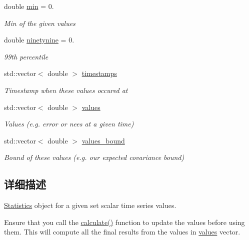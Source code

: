 \begin{DoxyCompactItemize}
\mbox{\label{structov__eval_1_1Statistics_ada14c28c46581e4e928f8eb7c86fdd06}} 
double \hyperlink{structov__eval_1_1Statistics_ada14c28c46581e4e928f8eb7c86fdd06}{min} = 0.
\begin{DoxyCompactList}\small\item\em Min of the given values \end{DoxyCompactList}\item 
\mbox{\label{structov__eval_1_1Statistics_a61e02141acabdb35b6e9bc9c1722653f}} 
double \hyperlink{structov__eval_1_1Statistics_a61e02141acabdb35b6e9bc9c1722653f}{ninetynine} = 0.
\begin{DoxyCompactList}\small\item\em 99th percentile \end{DoxyCompactList}\item 
\mbox{\label{structov__eval_1_1Statistics_a017b8f3c767271f7d586468ec86fe2b4}} 
std\+::vector$<$ double $>$ \hyperlink{structov__eval_1_1Statistics_a017b8f3c767271f7d586468ec86fe2b4}{timestamps}
\begin{DoxyCompactList}\small\item\em Timestamp when these values occured at \end{DoxyCompactList}\item 
\mbox{\label{structov__eval_1_1Statistics_a354bca50b835cca4be36ea1960561de7}} 
std\+::vector$<$ double $>$ \hyperlink{structov__eval_1_1Statistics_a354bca50b835cca4be36ea1960561de7}{values}
\begin{DoxyCompactList}\small\item\em Values (e.\+g. error or nees at a given time) \end{DoxyCompactList}\item 
\mbox{\label{structov__eval_1_1Statistics_a0ec5edc20462a1e6834547ed79d81377}} 
std\+::vector$<$ double $>$ \hyperlink{structov__eval_1_1Statistics_a0ec5edc20462a1e6834547ed79d81377}{values\+\_\+bound}
\begin{DoxyCompactList}\small\item\em Bound of these values (e.\+g. our expected covariance bound) \end{DoxyCompactList}\end{DoxyCompactItemize}


\subsection{详细描述}
\hyperlink{structov__eval_1_1Statistics}{Statistics} object for a given set scalar time series values. 

Ensure that you call the \hyperlink{structov__eval_1_1Statistics_ada896c0243989b2b8a366a0caa18a3c6}{calculate()} function to update the values before using them. This will compute all the final results from the values in \hyperlink{structov__eval_1_1Statistics_a354bca50b835cca4be36ea1960561de7}{values} vector. 